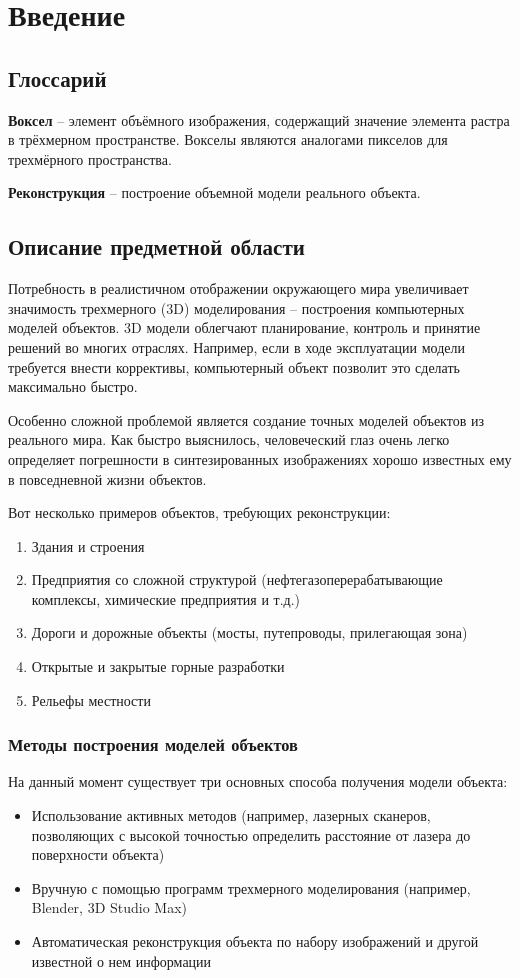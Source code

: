 \section{Введение}

\subsection{Глоссарий}
\textbf{Воксел} -- элемент объёмного изображения, содержащий значение элемента растра в трёхмерном пространстве. Вокселы являются аналогами пикселов для трехмёрного пространства.~\cite{wiki_voxel}

\textbf{Реконструкция} -- построение объемной модели реального объекта.

\subsection{Описание предметной области}
Потребность в реалистичном отображении окружающего мира увеличивает значимость трехмерного (3D) моделирования -- построения компьютерных моделей объектов. 3D модели облегчают планирование, контроль и принятие решений во многих отраслях. Например, если в ходе эксплуатации модели требуется внести коррективы, компьютерный объект позволит это сделать максимально быстро.

Особенно сложной проблемой является создание точных моделей объектов из реального мира.\cite{komarova_voxel_coloring} Как быстро выяснилось, человеческий глаз очень легко определяет погрешности в синтезированных изображениях хорошо известных ему в повседневной жизни объектов.

Вот несколько примеров объектов, требующих реконструкции:
\begin{enumerate}
\item Здания и строения
\item Предприятия со сложной структурой (нефтегазоперерабатывающие комплексы, химические предприятия и т.д.)
\item Дороги и дорожные объекты (мосты, путепроводы, прилегающая зона)
\item Открытые и закрытые горные разработки
\item Рельефы местности
\end{enumerate}

\subsubsection{Методы построения моделей объектов}
На данный момент существует три основных способа получения модели объекта:
\begin{itemize}
\item Использование активных методов (например, лазерных сканеров, позволяющих с высокой точностью определить расстояние от лазера до поверхности объекта)
\item Вручную с помощью программ трехмерного моделирования (например, Blender, 3D Studio Max)
\item Автоматическая реконструкция объекта по набору изображений и другой известной о нем информации
\end{itemize}


